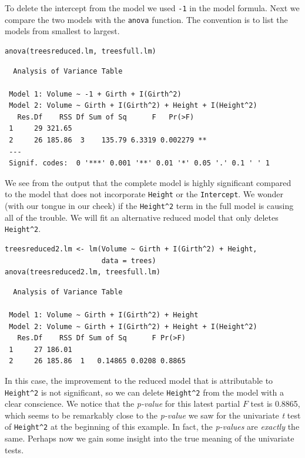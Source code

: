 \documentclass[captions=tableheading]{scrbook}
\begin{document}
\begin{example}
To delete the intercept from the model we used \texttt{-1} in the model formula. Next we compare the two models with the \texttt{anova} function. The convention is to list the models from smallest to largest.


\begin{verbatim}
anova(treesreduced.lm, treesfull.lm)
\end{verbatim}

\begin{verbatim}
  Analysis of Variance Table
 
 Model 1: Volume ~ -1 + Girth + I(Girth^2)
 Model 2: Volume ~ Girth + I(Girth^2) + Height + I(Height^2)
   Res.Df    RSS Df Sum of Sq      F   Pr(>F)   
 1     29 321.65                                
 2     26 185.86  3    135.79 6.3319 0.002279 **
 ---
 Signif. codes:  0 '***' 0.001 '**' 0.01 '*' 0.05 '.' 0.1 ' ' 1
\end{verbatim}

We see from the output that the complete model is highly significant compared to the model that does not incorporate \texttt{Height} or the \texttt{Intercept}. We wonder (with our tongue in our cheek) if the \texttt{Height\textasciicircum{}2} term in the full model is causing all of the trouble. We will fit an alternative reduced model that only deletes \texttt{Height\textasciicircum{}2}. 


\begin{verbatim}
treesreduced2.lm <- lm(Volume ~ Girth + I(Girth^2) + Height, 
                       data = trees)
anova(treesreduced2.lm, treesfull.lm)
\end{verbatim}

\begin{verbatim}
  Analysis of Variance Table
 
 Model 1: Volume ~ Girth + I(Girth^2) + Height
 Model 2: Volume ~ Girth + I(Girth^2) + Height + I(Height^2)
   Res.Df    RSS Df Sum of Sq      F Pr(>F)
 1     27 186.01                           
 2     26 185.86  1   0.14865 0.0208 0.8865
\end{verbatim}

In this case, the improvement to the reduced model that is attributable to \texttt{Height\textasciicircum{}2} is not significant, so we can delete \texttt{Height\textasciicircum{}2} from the model with a clear conscience. We notice that the \emph{p-value} for this latest partial \(F\) test is 0.8865, which seems to be remarkably close to the \emph{p-value} we saw for the univariate \emph{t} test of \texttt{Height\textasciicircum{}2} at the beginning of this example. In fact, the \emph{p-values} are \emph{exactly} the same. Perhaps now we gain some insight into the true meaning of the univariate tests.

\end{example}
\end{document}
